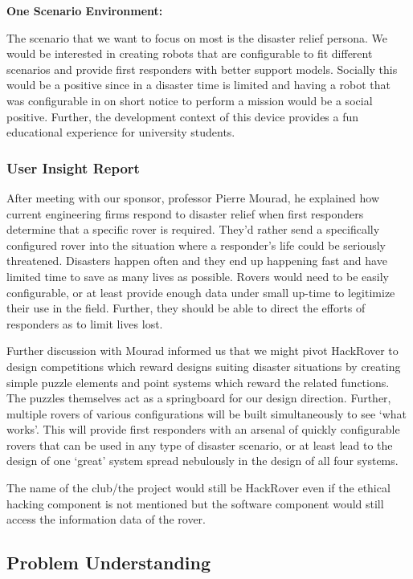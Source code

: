 \documentclass[a4paper, 10pt]{article}
\begin{document}
\textbf{One Scenario Environment:}

The scenario that we want to focus on most is the disaster relief persona. We would be interested in creating robots that are configurable to fit different scenarios and provide first responders with better support models. Socially this would be a positive since in a disaster time is limited and having a robot that was configurable in on short notice to perform a mission would be a social positive. Further, the development context of this device provides a fun educational experience for university students. 

		\subsubsection{User Insight Report}
			After meeting with our sponsor, professor Pierre Mourad, he explained how current engineering firms respond to disaster relief when first responders determine that a specific rover is required. They’d rather send a specifically configured rover into the situation where a responder’s life could be seriously threatened. Disasters happen often and they end up happening fast and have limited time to save as many lives as possible. Rovers would need to be easily configurable, or at least provide enough data under small up-time to legitimize their use in the field. Further, they should be able to direct the efforts of responders as to limit lives lost.

Further discussion with Mourad informed us that we might pivot HackRover to design competitions which reward designs suiting disaster situations by creating simple puzzle elements and point systems which reward the related functions. The puzzles themselves act as a springboard for our design direction. Further, multiple rovers of various configurations will be built simultaneously to see ‘what works’. This will provide first responders with an arsenal of quickly configurable rovers that can be used in any type of disaster scenario, or at least lead to the design of one ‘great’ system spread nebulously in the design of all four systems.

The name of the club/the project would still be HackRover even if the ethical hacking component is not mentioned but the software component would still access the information data of the rover.

	\subsection{Problem Understanding}
\end{document}
